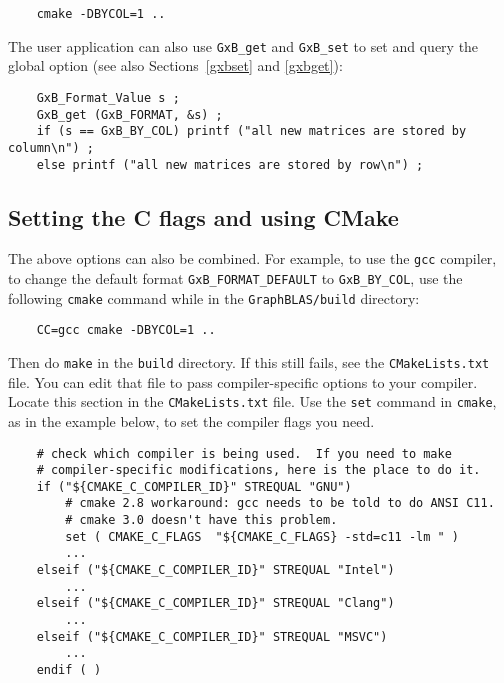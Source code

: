 \documentclass[12pt]{article}
\begin{document}
    {\small
    \begin{verbatim}
    cmake -DBYCOL=1 ..  \end{verbatim} }

The user application can also use \verb'GxB_get' and \verb'GxB_set' to set and
query the global option (see also Sections~\ref{gxbset} and \ref{gxbget}):

    {\small
    \begin{verbatim}
    GxB_Format_Value s ;
    GxB_get (GxB_FORMAT, &s) ;
    if (s == GxB_BY_COL) printf ("all new matrices are stored by column\n") ;
    else printf ("all new matrices are stored by row\n") ; \end{verbatim} }

\subsection{Setting the C flags and using CMake}

The above options can also be combined.  For example, to use the \verb'gcc'
compiler, to change the default format \verb'GxB_FORMAT_DEFAULT' to
\verb'GxB_BY_COL', use the following \verb'cmake' command while in the
\verb'GraphBLAS/build' directory:

    {\small
    \begin{verbatim}
    CC=gcc cmake -DBYCOL=1 .. \end{verbatim}}

\noindent
Then do \verb'make' in the \verb'build' directory.  If this still fails, see
the \verb'CMakeLists.txt' file.  You can edit that file to pass
compiler-specific options to your compiler.  Locate this section in the
\verb'CMakeLists.txt' file.  Use the \verb'set' command in \verb'cmake', as in
the example below, to set the compiler flags you need.

    {\small
    \begin{verbatim}
    # check which compiler is being used.  If you need to make
    # compiler-specific modifications, here is the place to do it.
    if ("${CMAKE_C_COMPILER_ID}" STREQUAL "GNU")
        # cmake 2.8 workaround: gcc needs to be told to do ANSI C11.
        # cmake 3.0 doesn't have this problem.
        set ( CMAKE_C_FLAGS  "${CMAKE_C_FLAGS} -std=c11 -lm " )
        ...
    elseif ("${CMAKE_C_COMPILER_ID}" STREQUAL "Intel")
        ...
    elseif ("${CMAKE_C_COMPILER_ID}" STREQUAL "Clang")
        ...
    elseif ("${CMAKE_C_COMPILER_ID}" STREQUAL "MSVC")
        ...
    endif ( )
    \end{verbatim} }
\end{document}
